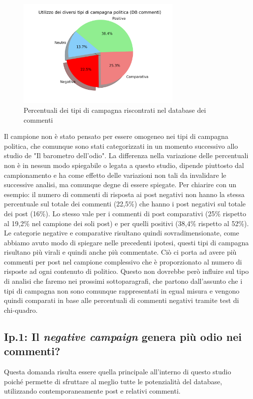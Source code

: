 \begin{figure}
	\includegraphics[width=8cm]{figures/tipoDiCampagnapie2}
	\caption{Percentuali dei tipi di campagna riscontrati nel database dei commenti}
	\label{tipoDiCampagnapie2}
\end{figure}

Il campione non è stato pensato per essere omogeneo nei tipi di campagna politica, che comunque sono stati categorizzati in un momento successivo allo studio de "Il barometro dell'odio". La differenza nella variazione delle percentuali non è in nessun modo spiegabile o legata a questo studio, dipende piuttosto dal campionamento e ha come effetto delle variazioni non tali da invalidare le successive analisi, ma comunque degne di essere spiegate. Per chiarire con un esempio: il numero di commenti di risposta ai post negativi non hanno la stessa percentuale sul totale dei commenti (22,5\%) che hanno i post negativi sul totale dei post (16\%). Lo stesso vale per i commenti di post comparativi (25\% rispetto al 19,2\% nel campione dei soli post) e per quelli positivi (38,4\% rispetto al 52\%). Le categorie negative e comparative risultano quindi sovradimensionate, come abbiamo avuto modo di spiegare nelle precedenti ipotesi, questi tipi di campagna risultano più virali e quindi anche più commentate. Ciò ci porta ad avere più commenti per post nel campione complessivo che è proporzionato al numero di risposte ad ogni contenuto di politico. Questo non dovrebbe però influire sul tipo di analisi che faremo nei prossimi sottoparagrafi, che partono dall'assunto che i tipi di campagna non sono comunque rappresentati in egual misura e vengono quindi comparati in base alle percentuali di commenti negativi tramite test di chi-quadro.

\subsection{Ip.1: Il \textit{negative campaign}  genera più odio nei commenti?}
Questa domanda risulta essere quella  principale all'interno di questo studio poiché permette di sfruttare al meglio tutte le potenzialità del database, utilizzando contemporaneamente post e relativi commenti.

